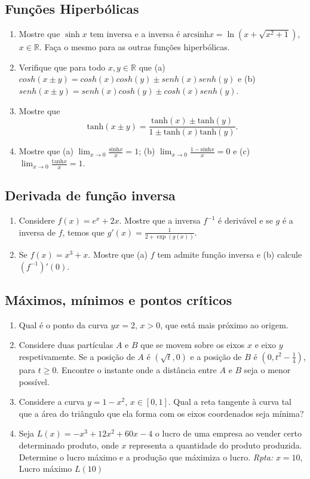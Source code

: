 \documentclass[latin,20pt]{article}
\begin{document}
    \subsection{Funções Hiperbólicas}
     \begin{enumerate}
     \item Mostre que $\sinh x$ tem inversa e a inversa é 
     $\text{arcsinh} x=\ln(x+\sqrt{x^{2}+1})$, $x \in \mathbb{R}$.
     Faça o mesmo para as outras funções hiperbólicas. 
     \item Verifique que para todo $x,y \in \mathbb{R}$ que 
     (a) 
     $cosh(x \pm y)=cosh(x)cosh(y)\pm senh(x)senh(y)$ e
      (b) 
     $senh(x \pm y)=senh(x)cosh(y)\pm cosh(x)senh(y)$. 
     \item Mostre que 
     $$\text{tanh}(x \pm y)=\frac{\text{tanh}(x) \pm \text{tanh}(y)}
     {1\pm \text{tanh}(x) \text{tanh}(y)}.$$     
     \item Mostre que 
     (a) $\lim_{x \rightarrow 0} \frac{\text{sinh} x}{x}=1$; 
     (b) $\lim_{x \rightarrow 0} \frac{1-\text{sinh} x}{x}=0$ e 
     (c) $\lim_{x \rightarrow 0} \frac{\text{tanh} x}{x}=1$.         
     \end{enumerate}
    \subsection{Derivada de função inversa}
      \begin{enumerate}
      \item Considere $f(x)=e^{x}+2x$. Mostre que a inversa $f^{-1}$
      é derivável e se $g$ é a inversa de $f$, temos que 
      $g'(x)=\frac{1}{2+\exp(g(x))}$.
      \item Se $f(x)=x^{3}+x$. Mostre que (a) $f$ tem admite 
      função inversa e (b) calcule $(f^{-1})'(0)$.
      \end{enumerate}
    \subsection{Máximos, mínimos e pontos críticos}
      \begin{enumerate}
      \item Qual é o ponto da curva $yx=2$, $x>0$, que está mais próximo ao origem. 
      \item Considere duas partículas $A$ e $B$ que se movem sobre os eixos $x$ e eixo $y$ respetivamente. Se a posição de $A$ é $(\sqrt{t}, 0)$ e 
      a posição de $B$ é $(0,t^{2}-\frac{1}{4})$, para $t \geq 0$. Encontre o instante onde a distância entre $A$ e $B$ seja o menor possível.
       \item Considere a curva $y=1-x^{2}$, $x \in [0,1]$. 
       Qual a reta tangente à curva tal que a área do triângulo que ela forma com os eixos coordenados seja mínima? 
       \item Seja $L(x)=-x^{3}+12x^{2}+60x-4$ o lucro de uma empresa ao vender certo determinado produto, onde $x$ representa a quantidade do produto produzida. Determine o lucro máximo e a produção que máximiza o lucro.
       {\it Rpta: } $x=10$, Lucro máximo $L(10)$   
      \end{enumerate}
\end{document}
